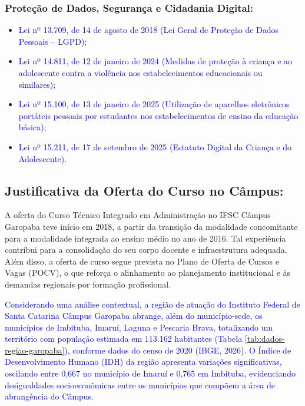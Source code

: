 \documentclass{../../modelos/latex-shared/ifsc-ppc}
\newcommand{\revisao}[1]{\textcolor{blue}{#1}}
\newcommand{\revisao}[1]{#1}
\begin{document}
\subsubsection{Proteção de Dados, Segurança e Cidadania Digital:}
\begin{itemize}
    \item \revisao{Lei nº 13.709, de 14 de agosto de 2018 (Lei Geral de Proteção de Dados Pessoais -- LGPD);}
    \item \revisao{Lei nº 14.811, de 12 de janeiro de 2024 (Medidas de proteção à criança e ao adolescente contra a violência nos estabelecimentos educacionais ou similares);}
    \item \revisao{Lei nº 15.100, de 13 de janeiro de 2025 (Utilização de aparelhos eletrônicos portáteis pessoais por estudantes nos estabelecimentos de ensino da educação básica);}
    \item \revisao{Lei nº 15.211, de 17 de setembro de 2025 (Estatuto Digital da Criança e do Adolescente).}
\end{itemize}

\subsection{Justificativa da Oferta do Curso no Câmpus:}
A oferta do Curso Técnico Integrado em Administração no IFSC Câmpus Garopaba teve início em 2018, a partir da transição da modalidade concomitante para a modalidade integrada ao ensino médio no ano de 2016. Tal experiência contribui para a consolidação do seu corpo docente e infraestrutura adequada. Além disso, a oferta de curso segue prevista no Plano de Oferta de Cursos e Vagas (POCV), o que reforça o alinhamento ao planejamento institucional e às demandas regionais por formação profissional.

\revisao{Considerando uma análise contextual, a região de atuação do Instituto Federal de Santa Catarina Câmpus Garopaba abrange, além do município-sede, os municípios de Imbituba, Imaruí, Laguna e Pescaria Brava, totalizando um território com população estimada em 113.162 habitantes (Tabela \ref{tab:dados-regiao-garopaba}), conforme dados do censo de 2020 (IBGE, 2026). O Índice de Desenvolvimento Humano (IDH) da região apresenta variações significativas, oscilando entre 0,667 no município de Imaruí e 0,765 em Imbituba, evidenciando desigualdades socioeconômicas entre os municípios que compõem a área de abrangência do Câmpus.}
\end{document}
